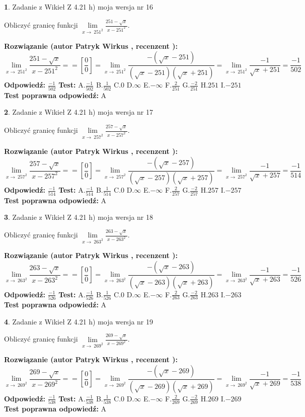 \documentclass[12pt, a4paper]{article}
\theoremstyle{definition} %
\newtheorem{zad}{}
\newcommand{\zadStart}[1]{\begin{zad}#1\newline}
\newcommand{\zadStop}{\end{zad}}
\newcommand{\rozwStart}[2]{\noindent \textbf{Rozwiązanie (autor #1 , recenzent #2): }\newline}
\newcommand{\rozwStop}{\newline}
\newcommand{\odpStart}{\noindent \textbf{Odpowiedź:}\newline}
\newcommand{\odpStop}{\newline}
\newcommand{\testStart}{\noindent \textbf{Test:}\newline}
\newcommand{\testStop}{\newline}
\newcommand{\kluczStart}{\noindent \textbf{Test poprawna odpowiedź:}\newline}
\newcommand{\kluczStop}{\newline}
\begin{document}
\zadStart{Zadanie z Wikieł Z 4.21 h) moja wersja nr 16}

Obliczyć granicę funkcji $\lim\limits_{x\to\ 251^{2}}\frac{251-\sqrt{x}}{x-251^{2}}$.
\zadStop
\rozwStart{Patryk Wirkus}{}
$$\lim\limits_{x\to\ 251^{2}}\frac{251-\sqrt{x}}{x-251^{2}} = = [\frac{0}{0}] = \lim\limits_{x\to\ 251^{2}}\frac{-(\sqrt{x}-251)}{(\sqrt{x}-251)(\sqrt{x}+251)} = \lim\limits_{x\to\ 251^{2}}\frac{-1}{\sqrt{x}+251} = \frac{-1}{502}$$
\rozwStop
\odpStart
$\frac{-1}{502}$
\odpStop
\testStart
A.$\frac{-1}{502}$ B.$\frac{1}{502}$ C.$0$ D.$\infty$ E.$-\infty$
F.$\frac{2}{251}$ G.$\frac{-2}{251}$
H.$251$
I.$-251$
\testStop
\kluczStart
A
\kluczStop



\zadStart{Zadanie z Wikieł Z 4.21 h) moja wersja nr 17}

Obliczyć granicę funkcji $\lim\limits_{x\to\ 257^{2}}\frac{257-\sqrt{x}}{x-257^{2}}$.
\zadStop
\rozwStart{Patryk Wirkus}{}
$$\lim\limits_{x\to\ 257^{2}}\frac{257-\sqrt{x}}{x-257^{2}} = = [\frac{0}{0}] = \lim\limits_{x\to\ 257^{2}}\frac{-(\sqrt{x}-257)}{(\sqrt{x}-257)(\sqrt{x}+257)} = \lim\limits_{x\to\ 257^{2}}\frac{-1}{\sqrt{x}+257} = \frac{-1}{514}$$
\rozwStop
\odpStart
$\frac{-1}{514}$
\odpStop
\testStart
A.$\frac{-1}{514}$ B.$\frac{1}{514}$ C.$0$ D.$\infty$ E.$-\infty$
F.$\frac{2}{257}$ G.$\frac{-2}{257}$
H.$257$
I.$-257$
\testStop
\kluczStart
A
\kluczStop



\zadStart{Zadanie z Wikieł Z 4.21 h) moja wersja nr 18}

Obliczyć granicę funkcji $\lim\limits_{x\to\ 263^{2}}\frac{263-\sqrt{x}}{x-263^{2}}$.
\zadStop
\rozwStart{Patryk Wirkus}{}
$$\lim\limits_{x\to\ 263^{2}}\frac{263-\sqrt{x}}{x-263^{2}} = = [\frac{0}{0}] = \lim\limits_{x\to\ 263^{2}}\frac{-(\sqrt{x}-263)}{(\sqrt{x}-263)(\sqrt{x}+263)} = \lim\limits_{x\to\ 263^{2}}\frac{-1}{\sqrt{x}+263} = \frac{-1}{526}$$
\rozwStop
\odpStart
$\frac{-1}{526}$
\odpStop
\testStart
A.$\frac{-1}{526}$ B.$\frac{1}{526}$ C.$0$ D.$\infty$ E.$-\infty$
F.$\frac{2}{263}$ G.$\frac{-2}{263}$
H.$263$
I.$-263$
\testStop
\kluczStart
A
\kluczStop



\zadStart{Zadanie z Wikieł Z 4.21 h) moja wersja nr 19}

Obliczyć granicę funkcji $\lim\limits_{x\to\ 269^{2}}\frac{269-\sqrt{x}}{x-269^{2}}$.
\zadStop
\rozwStart{Patryk Wirkus}{}
$$\lim\limits_{x\to\ 269^{2}}\frac{269-\sqrt{x}}{x-269^{2}} = = [\frac{0}{0}] = \lim\limits_{x\to\ 269^{2}}\frac{-(\sqrt{x}-269)}{(\sqrt{x}-269)(\sqrt{x}+269)} = \lim\limits_{x\to\ 269^{2}}\frac{-1}{\sqrt{x}+269} = \frac{-1}{538}$$
\rozwStop
\odpStart
$\frac{-1}{538}$
\odpStop
\testStart
A.$\frac{-1}{538}$ B.$\frac{1}{538}$ C.$0$ D.$\infty$ E.$-\infty$
F.$\frac{2}{269}$ G.$\frac{-2}{269}$
H.$269$
I.$-269$
\testStop
\kluczStart
A
\kluczStop
\end{document}
